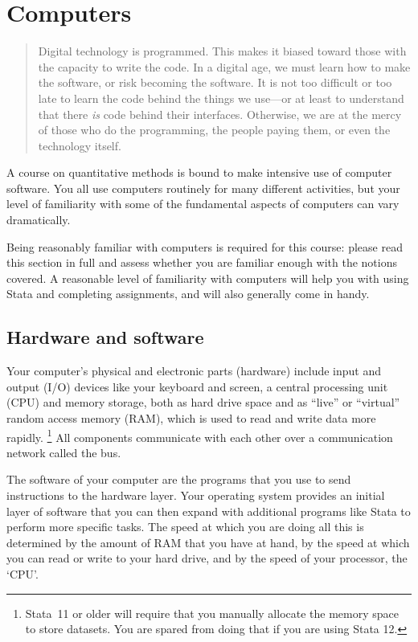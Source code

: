 %
%

\chapter{Computers}%
  \label{ch:computers}%

\begin{quote}%
  Digital technology is programmed. This makes it biased toward those with the capacity to write the code. In a digital age, we must learn how to make the software, or risk becoming the software. It is not too difficult or too late to learn the code behind the things we use—or at least to understand that there \emph{is} code behind their interfaces. Otherwise, we are at the mercy of those who do the programming, the people paying them, or even the technology itself. \cite[128]{Rushkoff:2010}%
\end{quote}

A course on quantitative methods is bound to make intensive use of computer software. You all use computers routinely for many different activities, but your level of familiarity with some of the fundamental aspects of computers can vary dramatically.

Being reasonably familiar with computers is required for this course: please read this section in full and assess whether you are familiar enough with the notions covered. A reasonable level of familiarity with computers will help you with using Stata and completing assignments, and will also generally come in handy.

%
\section*{Hardware and software}%

Your computer's physical and electronic parts (hardware) include input and output (I/O) devices like your keyboard and screen, a central processing unit (CPU) and memory storage, both as hard drive space and as ``live'' or ``virtual'' random access memory (RAM), which is used to read and write data more rapidly.%
  \footnote{Stata~11 or older will require that you manually allocate the memory space to store datasets. You are spared from doing that if you are using Stata 12.}%
  All components communicate with each other over a communication network called the bus.%

The software of your computer are the programs that you use to send instructions to the hardware layer. Your operating system provides an initial layer of software that you can then expand with additional programs like Stata to perform more specific tasks. The speed at which you are doing all this is determined by the amount of RAM that you have at hand, by the speed at which you can read or write to your hard drive, and by the speed of your processor, the `CPU'.%

